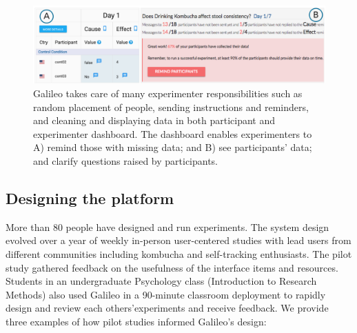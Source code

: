 \begin{figure}[!h] 
  \centering
  \includegraphics[width=1.0\textwidth]{figures/galileo/galileo-2-run-1}
  \caption[Galileo takes care of many experimenter responsibilities such as random placement of people, sending instructions and reminders, and cleaning and displaying data in both participant and experimenter dashboard]
{Galileo takes care of many experimenter responsibilities such as random placement of people, sending instructions and reminders, and cleaning and displaying data in both participant and experimenter dashboard. The dashboard enables experimenters to A) remind those with missing data; and B) see participants' data; and clarify questions raised by participants.}
  \label{fig:galileo-2-run-1}
\end{figure}

\subsection{Designing the platform}
More than 80 people have designed and run experiments. The system design evolved over a year of weekly in-person user-centered studies with lead users from different communities including kombucha and self-tracking enthusiasts. The pilot study gathered feedback on the usefulness of the interface items and resources. Students in an undergraduate Psychology class (Introduction to Research Methods) also used Galileo in a 90-minute classroom deployment to rapidly design and review each others'experiments and receive feedback. We provide three examples of how pilot studies informed Galileo's design:


